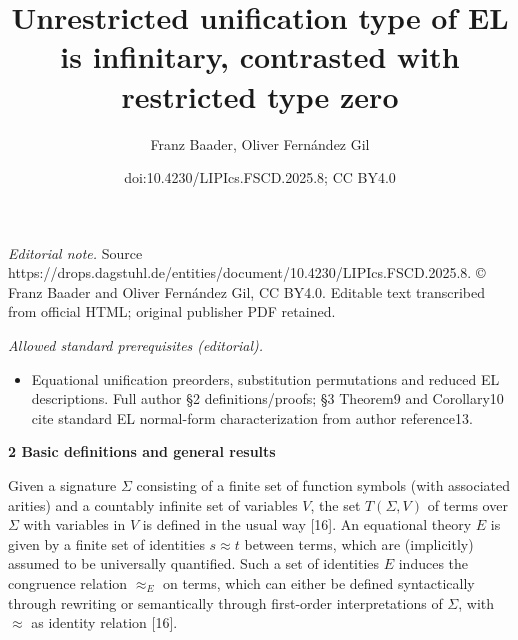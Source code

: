 \documentclass[10pt,a4paper]{amsart}
\title{Unrestricted unification type of EL is infinitary, contrasted with restricted type zero}
\author{Franz Baader, Oliver Fernández Gil}
\date{doi:10.4230/LIPIcs.FSCD.2025.8; CC BY4.0}
\begin{document}
\maketitle
\noindent\textit{Editorial note.} Source https://drops.dagstuhl.de/entities/document/10.4230/LIPIcs.FSCD.2025.8. © Franz Baader and Oliver Fernández Gil, CC BY4.0. Editable text transcribed from official HTML; original publisher PDF retained.\par\medskip
\noindent\textit{Allowed standard prerequisites (editorial).}\begin{itemize}
\item Equational unification preorders, substitution permutations and reduced EL descriptions. Full author §2 definitions/proofs; §3 Theorem9 and Corollary10 cite standard EL normal-form characterization from author reference13.
\end{itemize}\medskip
 
\par\medskip\noindent\textbf{2 Basic definitions and general results}\par
 
 
Given a signature $\Sigma$ consisting of a finite set of function symbols (with associated arities) and a countably infinite set of variables $V$, the set $T(\Sigma,V)$ of terms over $\Sigma$ with variables in $V$ is defined in the usual way [16]. An equational theory $E$ is given by a finite set of identities $s\approx t$ between terms, which are (implicitly) assumed to be universally quantified. Such a set of identities $E$ induces the congruence relation $\approx_{E}$ on terms, which can either be defined syntactically through rewriting or semantically through first-order interpretations of $\Sigma$, with $\approx$ as identity relation [16].\par
 
 
 
\end{document}
